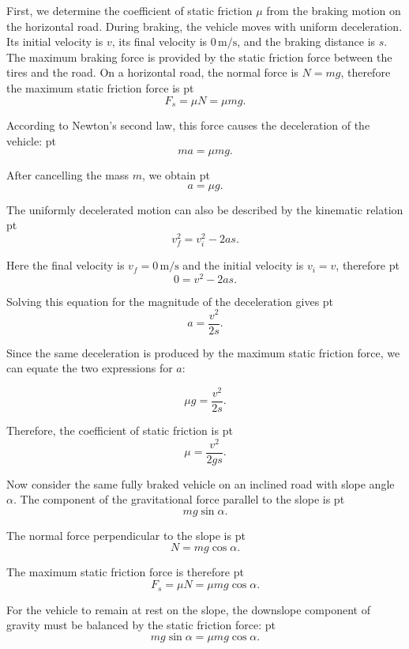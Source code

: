 \documentclass[t,aspectratio=169]{beamer}
\begin{document}
\begin{frame}
\begin{enumerate}
\begin{center}
\end{center}

\pagebreak
First, we determine the coefficient of static friction $\mu$ from the braking motion on the horizontal road. During braking, the vehicle moves with uniform deceleration. Its initial velocity is $v$, its final velocity is $0\,\mathrm{m/s}$, and the braking distance is $s$. The maximum braking force is provided by the static friction force between the tires and the road. On a horizontal road, the normal force is $N = mg$, therefore the maximum static friction force is
 pt
$$F_s = \mu N = \mu mg.$$

According to Newton's second law, this force causes the deceleration of the vehicle:
 pt
$$ma = \mu mg.$$

After cancelling the mass $m$, we obtain
 pt
$$a = \mu g.$$

\pagebreak
The uniformly decelerated motion can also be described by the kinematic relation
 pt
$$v_f^2 = v_i^2 - 2as.$$

Here the final velocity is $v_f = 0\,\mathrm{m/s}$ and the initial velocity is $v_i = v$, therefore
 pt
$$0 = v^2 - 2as.$$

Solving this equation for the magnitude of the deceleration gives
 pt
$$a = \frac{v^2}{2s}.$$

Since the same deceleration is produced by the maximum static friction force, we can equate the two expressions for $a$:

$$\mu g = \frac{v^2}{2s}.$$

\pagebreak
Therefore, the coefficient of static friction is
 pt
$$\mu = \frac{v^2}{2gs}.$$

Now consider the same fully braked vehicle on an inclined road with slope angle $\alpha$. The component of the gravitational force parallel to the slope is
 pt
$$mg\sin\alpha.$$

The normal force perpendicular to the slope is
 pt
$$N = mg\cos\alpha.$$

The maximum static friction force is therefore
 pt
$$F_s = \mu N = \mu mg\cos\alpha.$$

\pagebreak
For the vehicle to remain at rest on the slope, the downslope component of gravity must be balanced by the static friction force:
 pt
$$mg\sin\alpha = \mu mg\cos\alpha.$$


\end{enumerate}
\end{frame}
\end{document}
